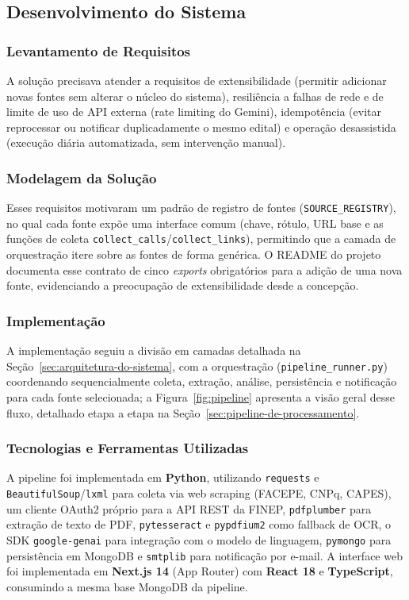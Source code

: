 \documentclass[12pt]{article}
\begin{document}
  \subsection{Desenvolvimento do Sistema}

  \subsubsection{Levantamento de Requisitos}
  A solução precisava atender a requisitos de extensibilidade (permitir adicionar novas fontes sem alterar o núcleo do sistema), resiliência a falhas de rede e de limite de uso de API externa (rate limiting do Gemini), idempotência (evitar reprocessar ou notificar duplicadamente o mesmo edital) e operação desassistida (execução diária automatizada, sem intervenção manual).

  \subsubsection{Modelagem da Solução}
  Esses requisitos motivaram um padrão de registro de fontes (\texttt{SOURCE\_REGISTRY}), no qual cada fonte expõe uma interface comum (chave, rótulo, URL base e as funções de coleta \texttt{collect\_calls}/\texttt{collect\_links}), permitindo que a camada de orquestração itere sobre as fontes de forma genérica. O README do projeto documenta esse contrato de cinco \emph{exports} obrigatórios para a adição de uma nova fonte, evidenciando a preocupação de extensibilidade desde a concepção.

  \subsubsection{Implementação}
  A implementação seguiu a divisão em camadas detalhada na Seção~\ref{sec:arquitetura-do-sistema}, com a orquestração (\texttt{pipeline\_runner.py}) coordenando sequencialmente coleta, extração, análise, persistência e notificação para cada fonte selecionada; a Figura~\ref{fig:pipeline} apresenta a visão geral desse fluxo, detalhado etapa a etapa na Seção~\ref{sec:pipeline-de-processamento}.

  \subsubsection{Tecnologias e Ferramentas Utilizadas}
  A pipeline foi implementada em \textbf{Python}, utilizando \texttt{requests} e \texttt{BeautifulSoup}/\texttt{lxml} para coleta via web scraping (FACEPE, CNPq, CAPES), um cliente OAuth2 próprio para a API REST da FINEP, \texttt{pdfplumber} para extração de texto de PDF, \texttt{pytesseract} e \texttt{pypdfium2} como fallback de OCR, o SDK \texttt{google-genai} para integração com o modelo de linguagem, \texttt{pymongo} para persistência em MongoDB e \texttt{smtplib} para notificação por e-mail. A interface web foi implementada em \textbf{Next.js 14} (App Router) com \textbf{React 18} e \textbf{TypeScript}, consumindo a mesma base MongoDB da pipeline.
\end{document}
